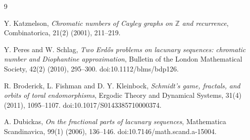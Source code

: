 \documentclass[11pt,fleqn]{article}
\newcommand{\Z}{\mathbb{Z}}
\begin{document}
\begin{thebibliography}{9}

Y. Katznelson,
\emph{Chromatic numbers of Cayley graphs on $\Z$ and recurrence},
Combinatorica, 21(2) (2001), 211--219.

Y. Peres and W. Schlag,
\emph{Two Erd\H{o}s problems on lacunary sequences: chromatic number and Diophantine approximation},
Bulletin of the London Mathematical Society, 42(2) (2010), 295--300.
doi:10.1112/blms/bdp126.

R. Broderick, L. Fishman and D. Y. Kleinbock,
\emph{Schmidt's game, fractals, and orbits of toral endomorphisms},
Ergodic Theory and Dynamical Systems, 31(4) (2011), 1095--1107.
doi:10.1017/S0143385710000374.

A. Dubickas,
\emph{On the fractional parts of lacunary sequences},
Mathematica Scandinavica, 99(1) (2006), 136--146.
doi:10.7146/math.scand.a-15004.

\end{thebibliography}
\end{document}
